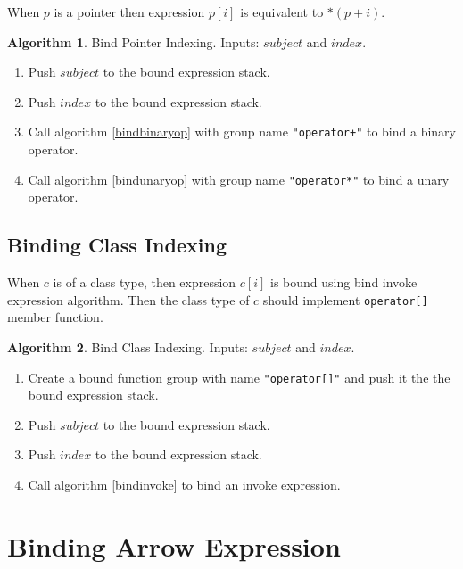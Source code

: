 \documentclass[a4paper,oneside,11pt]{book}
\theoremstyle{definition}
\newtheorem{algo}{Algorithm}[section]
\begin{document}
When $p$ is a pointer then expression $p[i]$ is equivalent to $*(p + i)$.

\begin{algo}\label{bindindexpointer} Bind Pointer Indexing.
Inputs: $subject$ and $index$.
\begin{enumerate}
\item
Push $subject$ to the bound expression stack.
\item
Push $index$ to the bound expression stack.
\item
Call algorithm \ref{bindbinaryop} with group name \verb|"operator+"| to bind a binary operator.
\item
Call algorithm \ref{bindunaryop} with group name \verb|"operator*"| to bind a unary operator.
\end{enumerate}
\end{algo}

\subsection{Binding Class Indexing}

When $c$ is of a class type, then expression $c[i]$ is bound using bind invoke expression algorithm.
Then the class type of $c$ should implement \verb|operator[]| member function.

\begin{algo}\label{bindindexclass} Bind Class Indexing.
Inputs: $subject$ and $index$.
\begin{enumerate}
\item
Create a bound function group with name \verb|"operator[]"| and push it the the bound expression stack.
\item
Push $subject$ to the bound expression stack.
\item
Push $index$ to the bound expression stack.
\item
Call algorithm \ref{bindinvoke} to bind an invoke expression.
\end{enumerate}
\end{algo}

\section{Binding Arrow Expression}
\end{document}
